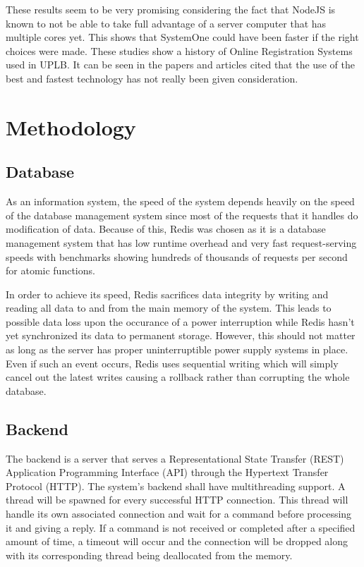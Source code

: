 \documentclass{sigchi}
\begin{document}
These results seem to be very promising considering the fact that NodeJS is known to not be
able to take full advantage of a server computer that has multiple cores yet. This shows that
SystemOne could have been faster if the right choices were made.
These studies show a history of Online Registration Systems used in UPLB. It can be seen in
the papers and articles cited that the use of the best and fastest technology has not really been
given consideration.

\section{Methodology}

\subsection{Database}

As an information system, the speed of the system depends heavily on the speed
of the database management system since most of the requests that it handles
do modification of data. Because of this, Redis was chosen as it is a database
management system that has low runtime overhead and very fast request-serving
speeds with benchmarks showing hundreds of thousands of requests per second for
atomic functions.

In order to achieve its speed, Redis sacrifices data integrity by writing
and reading all data to and from the main memory of the system. This leads to possible
data loss upon the occurance of a power interruption while Redis hasn't yet synchronized
its data to permanent storage. However, this should not matter as long as the server
has proper uninterruptible power supply systems in place. Even if such an event occurs,
Redis uses sequential writing which will simply cancel out the latest writes causing a
rollback rather than corrupting the whole database.

\subsection{Backend}

The backend is a server that serves a Representational State Transfer (REST)
Application Programming Interface (API) through the Hypertext Transfer Protocol
(HTTP). The system's backend shall have multithreading support. A thread will be 
spawned for every successful HTTP connection. This thread will handle its own
associated connection and wait for a command before processing it and giving a 
reply. If a command is not received or completed after a specified amount of
time, a timeout will occur and the connection will be dropped along with its
corresponding thread being deallocated from the memory. 
\end{document}
